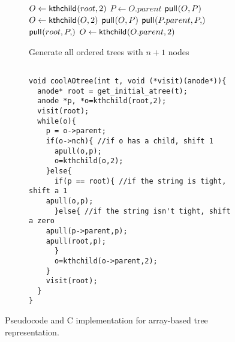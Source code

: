 \begin{figure}
    \centering
    \begin{subfigure}[t]{.49 \textwidth}
	\begin{center}
	    \begin{algorithm}[H] %
	    \begin{algorithmic}
		\State $O\gets \mathsf{kthchild}_{}(root,2)$
	\State {}
	    \State $P \gets O.parent$
		\State $\mathsf{pull}_{}(O,P)$
		\State $O \gets \mathsf{kthchild}_{}(O,2)$
	    \Else
		\State $\mathsf{pull}_{}(O,P)$
		\Else
		\State $\pull{P.parent,P}$
		\State $\pull{root,P}$
		\EndIf
		\State $O \gets \mathsf{kthchild}_{}(O.parent,2)$
	    \EndIf
	\State {}
        \EndWhile
    \EndFunction
	    \end{algorithmic}
    \caption*{Generate all ordered trees with $n+1$ nodes}
	\end{algorithm}
	\end{center}
	\label{fig:}
    \end{subfigure}
    \begin{subfigure}[t]{.5 \textwidth}
	\begin{center}
	    \vspace{.9em} %
\begin{Verbatim}[]

void coolAOtree(int t, void (*visit)(anode*)){
  anode* root = get_initial_atree(t);
  anode *p, *o=kthchild(root,2);
  visit(root);
  while(o){
    p = o->parent;
    if(o->nch){ //if o has a child, shift 1
      apull(o,p);
      o=kthchild(o,2);
    }else{
      if(p == root){ //if the string is tight, shift a 1
	apull(o,p);
      }else{ //if the string isn't tight, shift a zero
	apull(p->parent,p);
	apull(root,p);
      }
      o=kthchild(o->parent,2);
    }
    visit(root);
  }
}

\end{Verbatim}
	\end{center}
	\label{fig:}
    \end{subfigure}
    \cprotect\caption{Pseudocode and C implementation for array-based tree representation.}
    \label{fig:aotreeCode}
\end{figure}
